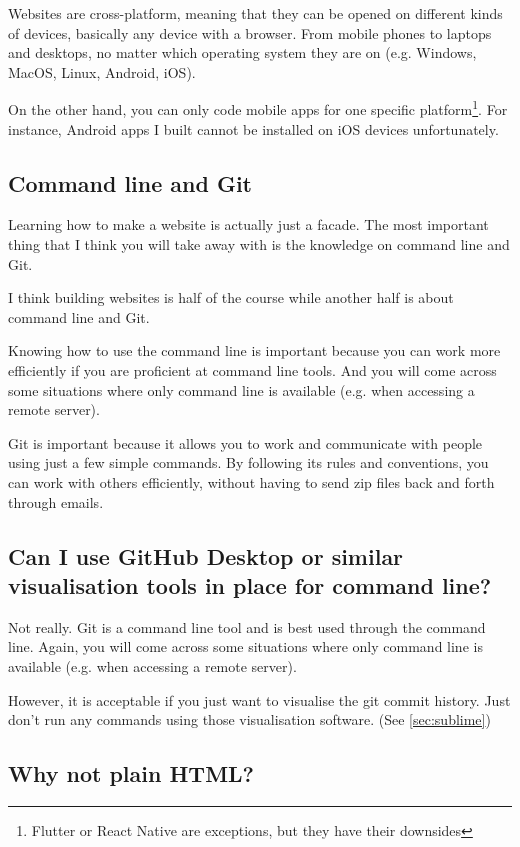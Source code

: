 Websites are cross-platform, meaning that they can be opened on different kinds of devices, basically any device with a browser. From mobile phones to laptops and desktops, no matter which operating system they are on (e.g. Windows, MacOS, Linux, Android, iOS).

On the other hand, you can only code mobile apps for one specific platform\footnote{Flutter or React Native are exceptions, but they have their downsides}. For instance, Android apps I built cannot be installed on iOS devices unfortunately.

\subsection*{Command line and Git}

Learning how to make a website is actually just a facade. The most important thing that I think you will take away with is the knowledge on command line and Git.

I think building websites is half of the course while another half is about command line and Git.

Knowing how to use the command line is important because you can work more efficiently if you are proficient at command line tools. And you will come across some situations where only command line is available (e.g. when accessing a remote server). 

Git is important because it allows you to work and communicate with people using just a few simple commands. By following its rules and conventions, you can work with others efficiently, without having to send zip files back and forth through emails. 

\subsection*{Can I use GitHub Desktop or similar visualisation tools in place for command line?}
\label{sec:githubdesktop}
Not really. Git is a command line tool and is best used through the command line. Again, you will come across some situations where only command line is available (e.g. when accessing a remote server). 

However, it is acceptable if you just want to visualise the git commit history. Just don't run any commands using those visualisation software. (See \cref{sec:sublime})

\subsection*{Why not plain HTML?}

